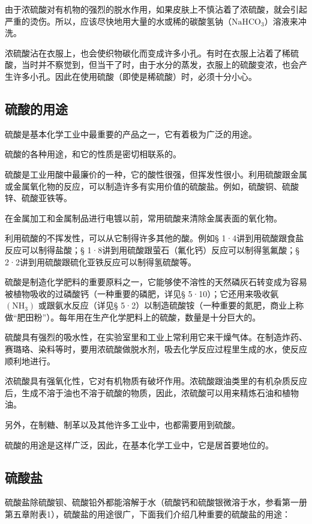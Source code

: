 由于浓硫酸对有机物的强烈的脱水作用，如果皮肤上不慎沾着了浓硫酸，就会引起严重的烫伤。所以，应该尽快地用大量的水或稀的碳酸氢钠（\(\mathrm{NaHCO_3}\)）溶液来冲洗。

浓硫酸沾在衣服上，也会使织物碳化而变成许多小孔。有时在衣服上沾着了稀硫酸，当时并不察觉到，但当干了时，由于水分的蒸发，衣服上的硫酸变浓，也会产生许多小孔。因此在使用硫酸（即使是稀硫酸）时，必须十分小心。

\subsection{硫酸的用途}

硫酸是基本化学工业中最重要的产品之一，它有着极为广泛的用途。

硫酸的各种用途，和它的性质是密切相联系的。

硫酸是工业用酸中最廉价的一种，它的酸性很强，但挥发性很小。利用硫酸跟金属或金属氧化物的反应，可以制造许多有实用价值的硫酸盐。例如，硫酸铜、硫酸锌、硫酸亚铁等。

在金属加工和金属制品进行电镀以前，常用硫酸来清除金属表面的氧化物。

利用硫酸的不挥发性，可以从它制得许多其他的酸。例如§
1·4讲到用硫酸跟食盐反应可以制得盐酸；§
1·8讲到用硫酸跟萤石（氟化钙）反应可以制得氢氟酸；§
2·2讲到用硫酸跟硫化亚铁反应可以制得氢硫酸等。

硫酸是制造化学肥料的重要原料之一，它能够使不溶性的天然磷灰石转变成为容易被植物吸收的过磷酸钙（一种重要的磷肥，详见§
5·10）；它还用来吸收氨 \(\left(\mathrm{NH}_{3}\right)\)
或跟氨水反应（详见§
5·2）以制造硫酸铵（一种重要的氮肥，商业上称做``肥田粉''）。每年用在生产化学肥料上的硫酸，数量是十分巨大的。

硫酸具有强烈的吸水性，在实验室里和工业上常利用它来干燥气体。在制造炸药、赛璐珞、染料等时，要用浓硫酸做脱水剂，吸去化学反应过程里生成的水，使反应顺利地进行。

浓硫酸具有强氧化性，它对有机物质有破坏作用。浓硫酸跟油类里的有机杂质反应后，生成不溶于油也不溶于硫酸的物质，因此，浓硫酸可以用来精炼石油和植物油。

另外，在制糖、制革以及其他许多工业中，也都需要用到硫酸。

硫酸的用途是这样广泛，因此，在基本化学工业中，它是居首要地位的。

\subsection{硫酸盐}

硫酸盐除硫酸钡、硫酸铅外都能溶解于水（硫酸钙和硫酸银微溶于水，参看第一册第五章附表1），硫酸盐的用途很广，下面我们介绍几种重要的硫酸盐的用途：

